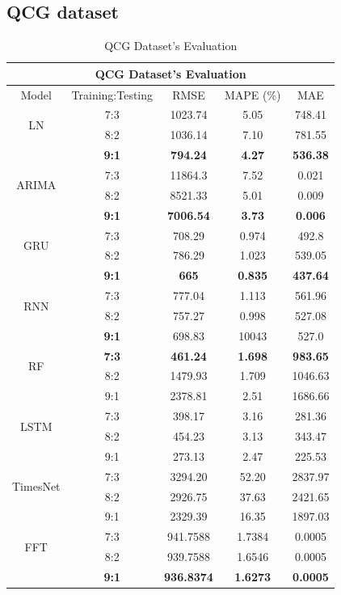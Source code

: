 \documentclass{ieeeojies}
\begin{document}
\subsection{QCG dataset} 
\begin{table}[H]
  \centering
  \begin{tabular}{|c|c|c|c|c|}
         \hline
         \multicolumn{5}{|c|}{\textbf{QCG Dataset's Evaluation}}\\
         \hline
         \centering Model & Training:Testing & RMSE & MAPE (\%) & MAE\\
         \hline
         \multirow{2}{*}{LN} & 7:3 & 1023.74 & 5.05 & 748.41 \\ & 8:2 & 1036.14 & 7.10 & 781.55 \\ & \textbf{9:1} & \textbf{794.24} & \textbf{4.27} & \textbf{536.38}\\
         \hline
         \multirow{2}{*}{ARIMA} & 7:3&11864.3&7.52&0.021\\ & 8:2&8521.33&5.01&0.009 \\ & \textbf{9:1} & \textbf{7006.54} & \textbf{3.73} & \textbf{0.006}\\
         \hline
         \multirow{2}{*}{GRU} & 7:3 & 708.29 & 0.974 & 492.8\\ & 8:2 & 786.29 & 1.023 & 539.05  \\ & \textbf{9:1} & \textbf{665}	& \textbf{0.835} &  \textbf{437.64} \\
         \hline
         \multirow{2}{*}{RNN} & 7:3 &  777.04 &  1.113 & 561.96 \\ & 8:2 &  757.27 & 0.998 &  527.08\\ & \textbf{9:1} & 698.83 & 10043 & 527.0\\
         \hline
         \multirow{2}{*}{RF} & \textbf{7:3}	& \textbf{461.24} & \textbf{1.698} & \textbf{983.65} \\ & 8:2 & 1479.93 & 1.709 & 1046.63 \\ & 9:1 & 2378.81 &  2.51 & 1686.66\\
         \hline
         \multirow{2}{*}{LSTM} & 7:3 & 398.17 & 3.16 & 281.36 \\ & 8:2 & 454.23 & 3.13 & 343.47 \\ & 9:1 & 273.13	&2.47&225.53\\
         \hline
         \multirow{2}{*}{TimesNet} & 7:3 & 3294.20 & 52.20 & 2837.97 \\ & 8:2 & 2926.75 & 37.63 & 2421.65 \\ & 9:1 & 2329.39	& 16.35 &1897.03\\
         \hline
         \multirow{2}{*}{FFT} & 7:3 & 941.7588 &  1.7384 &  0.0005 \\ & 8:2 & 939.7588 &  1.6546 &  0.0005 \\ & \textbf{9:1} & \textbf{936.8374} & \textbf{1.6273} & \textbf{0.0005}\\
         \hline
    \end{tabular}
    \caption{QCG Dataset's Evaluation}
    \label{vcbresult}
\end{table}
\end{document}
